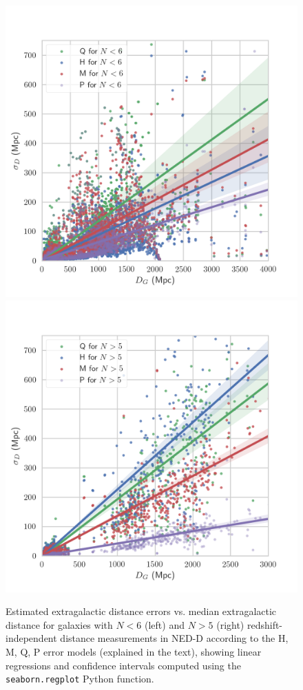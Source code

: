\documentclass[a4paper,fleqn,usenatbib]{mnras}
\begin{document}
\begin{figure}
	\includegraphics[scale=0.69]{Nlow.png}
	\includegraphics[scale=0.69]{Nhigh.png}
    \caption{Estimated extragalactic distance errors vs. median extragalactic distance for galaxies with $N<6$ (left) and $N>5$ (right)  redshift-independent distance measurements in NED-D according to the H, M, Q, P error models  (explained in the text), showing linear regressions and confidence intervals computed using the \texttt{seaborn.regplot} Python function.}
    \label{fig:NED}
\end{figure}
\end{document}
